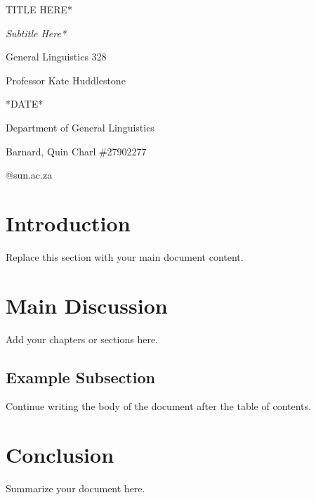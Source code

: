 \documentclass[12pt,a4paper]{article}
\makeatletter
\newcommand{\CoverCourse}{General Linguistics 328}
\newcommand{\CoverInstructor}{Professor Kate Huddlestone}
\newcommand{\CoverDate}{*DATE*}
\newcommand{\CoverDepartment}{Department of General Linguistics}
\newcommand{\CoverStudent}{Barnard, Quin Charl \#27902277}
\newcommand{\CoverEmail}{27902277@sun.ac.za}
\makeatother
\begin{document}
\begin{titlepage}
\thispagestyle{empty}

\vspace*{3.55in}

{\raggedleft
    {\fontsize{31}{35}\selectfont *TITLE HERE*\par}
\par}

\vspace{0.30in}

{\raggedleft
    {\itshape\fontsize{18}{22}\selectfont *Subtitle Here*\par}
\par}

\vspace{0.45in}

\begin{raggedleft}
   {\fontsize{18}{21}\selectfont \CoverCourse\par}
    \vspace{0.03in}
    {\fontsize{11}{14}\selectfont
      \CoverInstructor\par
      \CoverDate\par
      \CoverDepartment\par}
\end{raggedleft}

\vspace{0.55in}

\begin{raggedleft}
    {\fontsize{15}{18}\selectfont \CoverStudent\par}
    \vspace{0.04in}
    {\fontsize{10}{12}\selectfont \CoverEmail\par}
\end{raggedleft}
\end{titlepage}

\setcounter{page}{1}
\tableofcontents
\clearpage

\onehalfspacing

\section{Introduction}
Replace this section with your main document content.

\section{Main Discussion}
Add your chapters or sections here.

\subsection{Example Subsection}
Continue writing the body of the document after the table of contents.

\section{Conclusion}
Summarize your document here.
\end{document}
